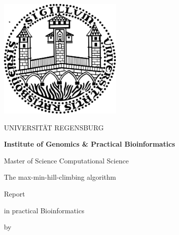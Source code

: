 
\usepackage{geometry}
\geometry{tmargin=2cm,bmargin=3cm,lmargin=2cm,rmargin=2cm}

\usepackage{tikz}
\usetikzlibrary{arrows}


\pagestyle{empty}

\clearscrheadings\clearscrplain

\begin{center}
\includegraphics[width=6cm]{img/uniR.png}

\begin{huge}
UNIVERSITÄT REGENSBURG
\vspace{10mm}
\end{huge}

{\Large \textbf{Institute of Genomics \& Practical Bioinformatics}}
\vspace{0mm}

{\Large Master of Science Computational Science}

\vspace{10mm}
\begin{huge}
The max-min-hill-climbing algorithm
\end{huge}

\vspace{10mm}

\begin{Large}
Report
\end{Large}

\begin{large}
in practical Bioinformatics
\end{large}

\vspace{5mm}
\begin{small}
by
\end{small}


\end{center}
